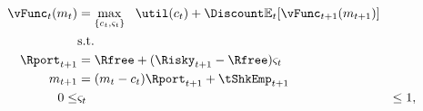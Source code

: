   \begin{equation*}\begin{gathered}\begin{aligned}
    {\vFunc}_{t}({m}_{t})  & = \max_{\{{c}_{t},\varsigma_{t}\}}   ~~ \util({c}_{t}) +  \Discount
                                \Ex_{t}[{\vFunc}_{t+1}({m}_{t+1})]
    \\      & \text{s.t.} & \nonumber
    \\      \Rport_{t+1}  & = \Rfree + (\Risky_{t+1}-\Rfree) \varsigma_{t}
    \\      {m}_{t+1}  & = ({m}_{t}-{c}_{t})\Rport_{t+1} + \tShkEmp_{t+1}
    \\  0       \leq & \varsigma_{t} & \leq 1, \label{eq:noshorts}
  \end{aligned}\end{gathered}\end{equation*}
